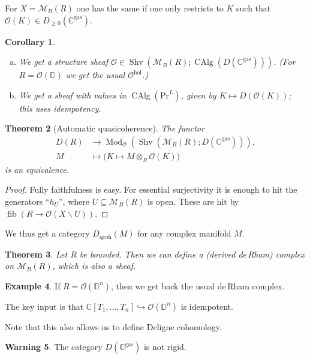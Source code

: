 \documentclass[draft]{amsart}
\newcommand{\DD}{\mathbb{D}}
\newcommand{\CC}{\mathbb{C}}
\renewcommand{\O}{\mathcal{O}}
\newcommand{\cat}[1]{\mathcal{#1}}
\renewcommand{\setminus}{\smallsetminus}
\newcommand{\injto}{\mathbin{\hookrightarrow}}
\renewcommand{\Pr}{\mathrm{Pr}}
\DeclareMathOperator{\fib}{fib}
\DeclareMathOperator{\CAlg}{CAlg}
\DeclareMathOperator{\Shv}{Shv}
\DeclareMathOperator{\Mod}{Mod}
\newtheorem{thm}{Theorem}[section]
\newtheorem{cor}[thm]{Corollary}
\theoremstyle{definition}
\newtheorem{ex}[thm]{Example}
\newtheorem{warning}[thm]{Warning}
\begin{document}
For $X = \cat M_B(R)$ one has the same if one only restricts to $K$ such that $\O(K) \in D_{\ge0}(\CC^{\mathrm{gas}})$.

\begin{cor}
\begin{enumerate}[(a)]
\item We get a structure sheaf $\O \in \Shv(\cat M_B(R); \CAlg(D(\CC^{\mathrm{gas}})))$. (For $R = \O(\DD)$ we get the usual $\O^{\mathrm{hol}}$.)

\item We get a sheaf with values in $\CAlg(\Pr^L)$, given by $K\mapsto D(\O(K))$; this uses idempotency.
\end{enumerate}
\end{cor}

\begin{thm}[Automatic quasicoherence]
The functor
\begin{align*}
D(R) &\to \Mod_{\O}(\Shv(\cat M_B(R); D(\CC^{\mathrm{gas}}))), \\
M &\mapsto \bigl(K\mapsto M\otimes_R\O(K)\bigr)
\end{align*}
is an equivalence.
\end{thm}
\begin{proof}
Fully faithfulness is easy. For essential surjectivity it is enough to hit the generators \enquote{$h_U$}, where $U \subseteq \cat M_B(R)$ is open. These are hit by $\fib(R\to \O(X\setminus U))$.
\end{proof}

We thus get a category $D_{\mathrm{qcoh}}(M)$ for any complex manifold $M$.

\begin{thm}
Let $R$ be bounded. Then we can define a (derived de\,Rham) complex on $\cat M_B(R)$, which is also a sheaf.
\end{thm}

\begin{ex}
If $R = \O(\DD^n)$, then we get back the usual de\,Rham complex.

The key input is that $\CC[T_1,\dotsc, T_n] \injto \O(\DD^n)$ is idempotent.
\end{ex}

Note that this also allows us to define Deligne cohomology.

\begin{warning}
The category $D(\CC^{\mathrm{gas}})$ is not rigid.
\end{warning}
\end{document}
